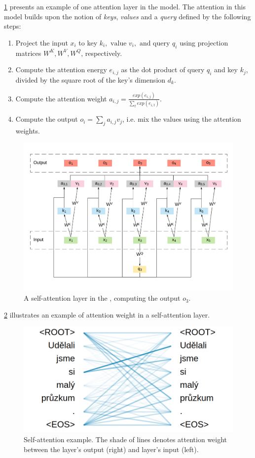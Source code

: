 \cref{fig:self-att-layer} presents an example of one attention layer in the \transformer model.
The attention in this model builds upon the notion of \textit{keys}, \textit{values} and a \textit{query} defined by the following steps:
\begin{enumerate}
    \item Project the input $x_i$ to key $k_i, \text{ value } v_i, \text{ and query } q_i$ using projection matrices $W^K, W^V, W^Q$, respectively.
    \item Compute the attention energy $e_{i,j}$ as the dot product of query $q_i$ and key $k_j$, divided by the square root of the key's dimension $d_k$.
    \item Compute the attention weight $a_{i,j}=\frac{exp(e_{i,j})}{\sum_{t}exp(e_{i,t})}$.
    \item Compute the output $o_i = \sum_{j} a_{i,j}v_j$, i.e. mix the values using the attention weights.
\end{enumerate}

\begin{figure}[t]
    \centering
    \includegraphics[width=\linewidth]{img/self-att.pdf}
    \caption{A self-attention layer in the \transformer, computing the output $o_3$.}
    \label{fig:self-att-layer}
\end{figure}

\cref{fig:self-att-sample} illustrates an example of attention weight in a self-attention layer.

\begin{figure}[t]
    \centering
    \includegraphics[width=0.6\linewidth]{img/self-att-sample.png}
    \caption{Self-attention example. The shade of lines denotes attention weight between the layer's output (right) and layer's input (left).}
    \label{fig:self-att-sample}
\end{figure}

